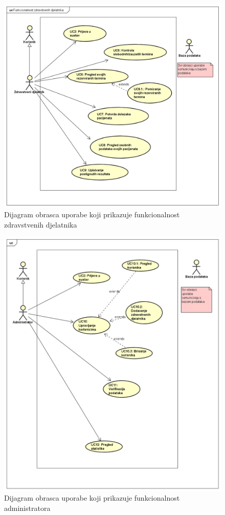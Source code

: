 \begin{figure}[H]
	\includegraphics[scale=0.6]{slike/ZdravstveniDjelatnik.PNG} %
	\centering
	\caption{Dijagram obrasca uporabe koji prikazuje funkcionalnost zdravstvenih djelatnika}
	\label{fig:promjene}
\end{figure}

\begin{figure}[H]
	\includegraphics[scale=0.6]{slike/Administrator.PNG} %
	\centering
	\caption{Dijagram obrasca uporabe koji prikazuje funkcionalnost administratora}
	\label{fig:promjene}
\end{figure}

